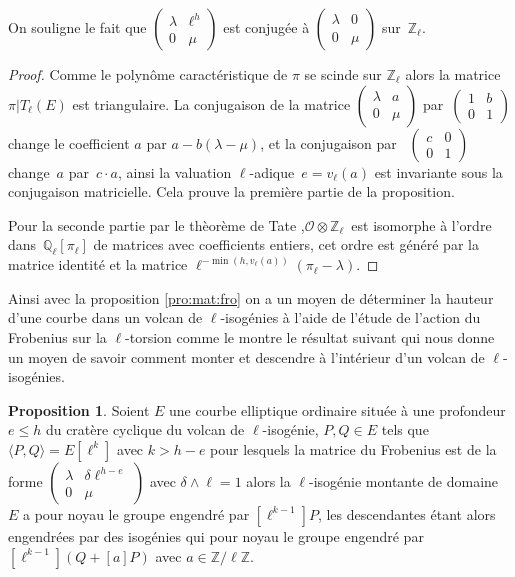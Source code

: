 \documentclass[10pt,a4paper]{book}
\theoremstyle{plain}
\theoremstyle{definition}
\theoremstyle{definition}
\theoremstyle{definition}
\newtheorem{prop}[thm]{Proposition}
\theoremstyle{definition}
\theoremstyle{remark}
\theoremstyle{remark}
\theoremstyle{definition}
\begin{document}
On souligne le fait que $\left(\begin{smallmatrix} \lambda & \ell^h \\ 0 &
\mu \end{smallmatrix}\right)$ est conjugée à $\left(\begin{smallmatrix} \lambda & 0 \\ 0 & \mu\end{smallmatrix}\right)$ sur~$\mathbb{Z}_{\ell}$.
\begin{proof}
Comme le polynôme caractéristique de $\pi$ se scinde sur $\mathbb{Z}_{\ell}$ 
alors la matrice $\pi|T_{\ell}(E)$ est triangulaire.
La conjugaison de la matrice $\left ( \begin{smallmatrix}\lambda & a\\0 & \mu
\end{smallmatrix}\right )$ par~$\left ( \begin{smallmatrix}1 & b\\0 & 1
\end{smallmatrix} \right )$ change le coefficient $a$ par $a-b (\lambda - \mu)$, 
et la conjugaison par ~$\left(\begin{smallmatrix} c & 0 \\ 0 &
1\end{smallmatrix}\right)$ change~$a$ par~$c \cdot a$,
ainsi la valuation $\ell$-adique~$e = v_{\ell}(a)$ est invariante sous la conjugaison matricielle.
Cela prouve la première partie de la proposition. 

Pour la seconde partie par le thèorème de Tate \cite[Isogeny theorem III.7.7 (a)]{Silv1},$\mathcal{O} \otimes \mathbb{Z}_{\ell}$~est isomorphe à l'ordre dans~$\mathbb{Q}_{\ell}[\pi_{\ell}]$
de matrices avec coefficients entiers, cet ordre est généré par la matrice identité et la matrice 
$\ell^{-\min (h, v_{\ell}(a))} (\pi_{\ell}-\lambda)$.
\end{proof}

Ainsi avec la proposition \ref{pro:mat:fro} on a un moyen de déterminer la hauteur d'une courbe dans un volcan de $\ell$-isogénies à l'aide de l'étude de l'action du Frobenius sur la $\ell$-torsion comme le montre le résultat suivant qui nous donne un moyen de savoir comment monter et descendre à l'intérieur d'un volcan de $\ell$-isogénies.

\begin{prop}
\label{pro:tri:dir}
Soient $E$ une courbe elliptique ordinaire située à une profondeur $e \leqslant h$ du cratère cyclique du volcan de $\ell$-isogénie, $P,Q \in E$ tels que $\langle P,Q \rangle = E[\ell^k]$ avec $k>h-e$ pour lesquels la matrice du Frobenius est de la forme $\left( \begin{smallmatrix} \lambda & \delta \ell^{h-e} \\ 0 & \mu \end{smallmatrix} \right)$ avec $\delta \wedge \ell=1$ alors la $\ell$-isogénie montante de domaine $E$ a pour noyau le groupe engendré par  $[\ell^{k-1}]P$, les descendantes étant alors engendrées par des isogénies qui pour noyau le groupe engendré par $[\ell^{k-1}](Q+[a]P)$ avec $a \in \mathbb{Z}/\ell \mathbb{Z}$.
\end{prop}
\end{document}
